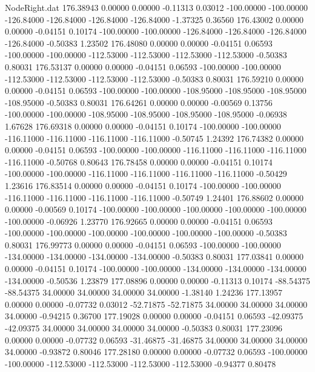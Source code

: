 \begin{filecontents}{NodeRight.dat}
 176.38943    0.00000    0.00000    -0.11313    0.03012 -100.00000 -100.00000 -126.84000 -126.84000 -126.84000 -126.84000   -1.37325    0.36560
 176.43002    0.00000    0.00000    -0.04151    0.10174 -100.00000 -100.00000 -126.84000 -126.84000 -126.84000 -126.84000   -0.50383    1.23502
 176.48080    0.00000    0.00000    -0.04151    0.06593 -100.00000 -100.00000 -112.53000 -112.53000 -112.53000 -112.53000   -0.50383    0.80031
 176.53137    0.00000    0.00000    -0.04151    0.06593 -100.00000 -100.00000 -112.53000 -112.53000 -112.53000 -112.53000   -0.50383    0.80031
 176.59210    0.00000    0.00000    -0.04151    0.06593 -100.00000 -100.00000 -108.95000 -108.95000 -108.95000 -108.95000   -0.50383    0.80031
 176.64261    0.00000    0.00000    -0.00569    0.13756 -100.00000 -100.00000 -108.95000 -108.95000 -108.95000 -108.95000   -0.06938    1.67628
 176.69318    0.00000    0.00000    -0.04151    0.10174 -100.00000 -100.00000 -116.11000 -116.11000 -116.11000 -116.11000   -0.50745    1.24392
 176.74382    0.00000    0.00000    -0.04151    0.06593 -100.00000 -100.00000 -116.11000 -116.11000 -116.11000 -116.11000   -0.50768    0.80643
 176.78458    0.00000    0.00000    -0.04151    0.10174 -100.00000 -100.00000 -116.11000 -116.11000 -116.11000 -116.11000   -0.50429    1.23616
 176.83514    0.00000    0.00000    -0.04151    0.10174 -100.00000 -100.00000 -116.11000 -116.11000 -116.11000 -116.11000   -0.50749    1.24401
 176.88602    0.00000    0.00000    -0.00569    0.10174 -100.00000 -100.00000 -100.00000 -100.00000 -100.00000 -100.00000   -0.06926    1.23770
 176.92665    0.00000    0.00000    -0.04151    0.06593 -100.00000 -100.00000 -100.00000 -100.00000 -100.00000 -100.00000   -0.50383    0.80031
 176.99773    0.00000    0.00000    -0.04151    0.06593 -100.00000 -100.00000 -134.00000 -134.00000 -134.00000 -134.00000   -0.50383    0.80031
 177.03841    0.00000    0.00000    -0.04151    0.10174 -100.00000 -100.00000 -134.00000 -134.00000 -134.00000 -134.00000   -0.50536    1.23879
 177.08896    0.00000    0.00000    -0.11313    0.10174  -88.54375  -88.54375   34.00000   34.00000   34.00000   34.00000   -1.38140    1.24236
 177.13957    0.00000    0.00000    -0.07732    0.03012  -52.71875  -52.71875   34.00000   34.00000   34.00000   34.00000   -0.94215    0.36700
 177.19028    0.00000    0.00000    -0.04151    0.06593  -42.09375  -42.09375   34.00000   34.00000   34.00000   34.00000   -0.50383    0.80031
 177.23096    0.00000    0.00000    -0.07732    0.06593  -31.46875  -31.46875   34.00000   34.00000   34.00000   34.00000   -0.93872    0.80046
 177.28180    0.00000    0.00000    -0.07732    0.06593 -100.00000 -100.00000 -112.53000 -112.53000 -112.53000 -112.53000   -0.94377    0.80478

\end{filecontents}
